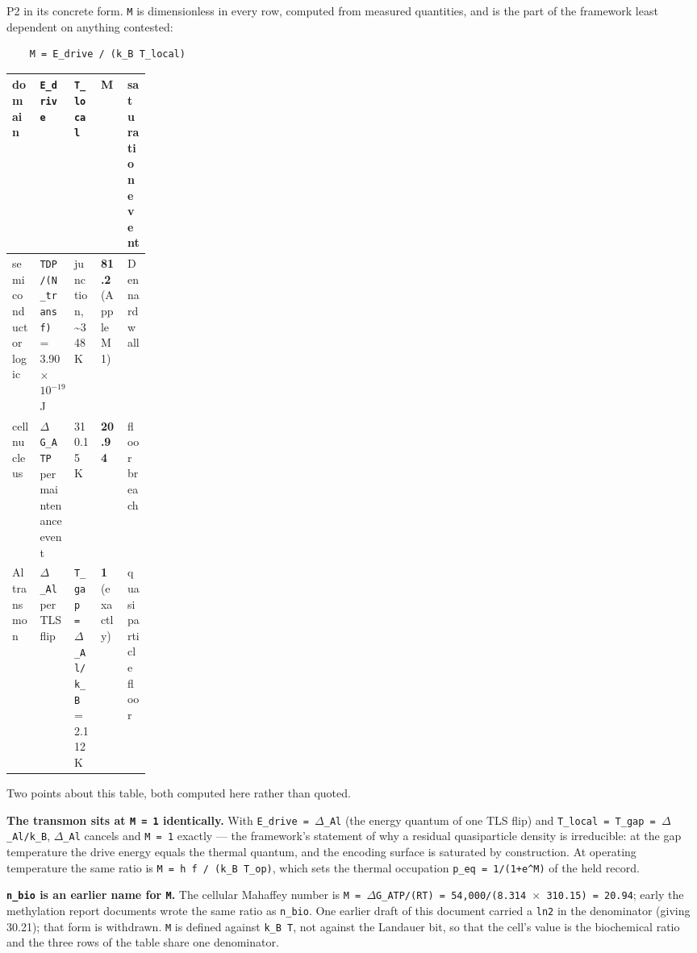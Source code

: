 \documentclass[12pt,a4paper]{article}
\begin{document}
P2 in its concrete form. \texttt{M} is dimensionless in every row, computed from measured quantities, and is the part of the framework least dependent on anything contested:


\begin{lstlisting}
    M = E_drive / (k_B T_local)
\end{lstlisting}


\begin{small}
\begingroup\footnotesize
\begin{tabularx}{\linewidth}{L{0.20\linewidth}YYYY}
\toprule
\textbf{domain} & \textbf{\texttt{E\_\allowbreak{}drive}} & \textbf{\texttt{T\_\allowbreak{}local}} & \textbf{\textbf{M}} & \textbf{saturation event} \\
\midrule
semiconductor logic & \texttt{TDP/\allowbreak{}(N\_\allowbreak{}trans f)} = 3.90 $\times$ $10^{-19}$ J & junction, \textasciitilde{}348 K & \textbf{81.2} (Apple M1) & Dennard wall \\
cell nucleus & \texttt{$\Delta$G\_\allowbreak{}ATP} per maintenance event & 310.15 K & \textbf{20.94} & floor breach \\
Al transmon & \texttt{$\Delta$\_\allowbreak{}Al} per TLS flip & \texttt{T\_\allowbreak{}gap = $\Delta$\_\allowbreak{}Al/\allowbreak{}k\_\allowbreak{}B} = 2.112 K & \textbf{1} (exactly) & quasiparticle floor \\
\bottomrule
\end{tabularx}
\endgroup
\end{small}


Two points about this table, both computed here rather than quoted.


\textbf{The transmon sits at \texttt{M = 1} identically.} With \texttt{E\_drive = $\Delta$\_Al} (the energy quantum of one TLS flip) and \texttt{T\_local = T\_gap = $\Delta$\_Al/k\_B}, \texttt{$\Delta$\_Al} cancels and \texttt{M = 1} exactly --- the framework's statement of why a residual quasiparticle density is irreducible: at the gap temperature the drive energy equals the thermal quantum, and the encoding surface is saturated by construction. At operating temperature the same ratio is \texttt{M = h f / (k\_B T\_op)}, which sets the thermal occupation \texttt{p\_eq = 1/(1+e\textasciicircum{}M)} of the held record.


\textbf{\texttt{n\_bio} is an earlier name for \texttt{M}.} The cellular Mahaffey number is \texttt{M = $\Delta$G\_ATP/(RT) = 54,000/(8.314 $\times$ 310.15) = 20.94}; early the methylation report documents wrote the same ratio as \texttt{n\_bio}. One earlier draft of this document carried a \texttt{ln2} in the denominator (giving 30.21); that form is withdrawn. \texttt{M} is defined against \texttt{k\_B T}, not against the Landauer bit, so that the cell's value is the biochemical ratio and the three rows of the table share one denominator.
\end{document}

